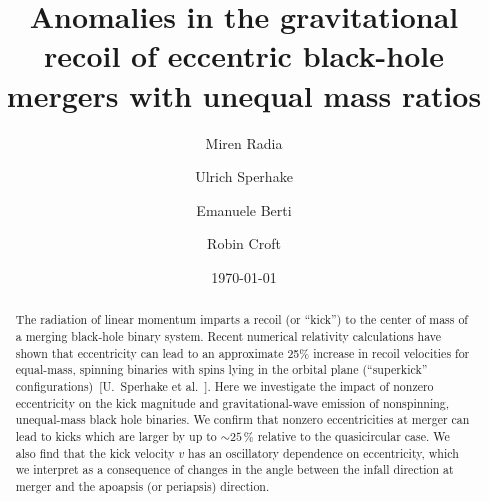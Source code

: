 \documentclass[floats,floatfix,showpacs,amssymb,physrev,twocolumn,superscriptaddress,reprint,
nofootinbib, longbibliography]{revtex4-2}
\begin{document}
\title{Anomalies in the gravitational recoil of eccentric black-hole mergers with unequal mass ratios}

\author{Miren Radia}

\author{Ulrich Sperhake}

\author{Emanuele Berti}

\author{Robin Croft}

\date{\today}

\begin{abstract}
  The radiation of linear momentum imparts a recoil (or ``kick'') to
  the center of mass of a merging black-hole binary system. Recent
  numerical relativity calculations have shown that
  eccentricity can lead to an approximate 25\% increase in recoil
  velocities for equal-mass, spinning binaries with spins lying in the
  orbital plane (``superkick'' configurations)~[U.~Sperhake et al.~].
  Here we investigate the impact of nonzero eccentricity on the kick
  magnitude and gravitational-wave emission of nonspinning,
  unequal-mass black hole binaries. We confirm that nonzero
  eccentricities at merger can lead to kicks which are larger by
  up to $\sim 25\,\%$ relative to the quasicircular case.
  We also find that the kick velocity $v$ has an oscillatory
  dependence on eccentricity, which we interpret as a consequence of
  changes in the angle between the infall direction at merger and the
  apoapsis (or periapsis) direction.
\end{abstract}

\maketitle
\end{document}
